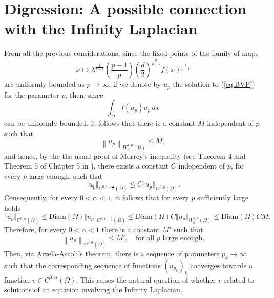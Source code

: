 \documentclass[11pt]{amsart}
\theoremstyle{definition}
\begin{document}
  \section{Digression: A possible connection with the Infinity Laplacian}  
\label{section:final_digression}
From all the previous considerations, since the fixed
points of the family of maps
\[
x\mapsto \lambda^{\frac{1}{p-1}}  \left(\frac{p-1}{p}\right)
\left(\frac{d}{2}\right)^{\frac{p}{p-1}}f\left(x\right)^{\frac{1}{p-1}}
\]
are uniformly bounded as $p\rightarrow\infty$, if we denote by $u_p$ the
solution to (\ref{eq:BVP}) for the parameter $p$, then, since
\[
\int_{\Omega}f\left(u_p\right)u_p\, dx
\]
can be uniformly bounded, 
it follows that there is a constant $M$ independent
of $p$ such that
\[
\left\|u_p\right\|_{W^{1,p}_0\left(\Omega\right)}
\leq M,
\]
and hence, by the the usual proof of Morrey's inequality (see Theorem 4 and  Theorem 5 of Chapter 5 in \cite{EvansBook}), there exists a constant $C$ independent of $p$, for every $p$ large enough, such that
$$\Vert u_p\Vert_{C^{0,1-\frac{n}{p}}(\overline\Omega)}\leq C\Vert u_p\Vert_{W^{1,p}(\Omega)}.$$
Consequently, for every $0<\alpha<1$, it follows that for every $p$ sufficiently large holds
$$\Vert u_p\Vert_{C^{0,\alpha}(\overline \Omega)}\leq\text{Diam}(\Omega)\Vert u_p\Vert_{C^{0,1-\frac{n}{p}}(\overline \Omega)}\leq \text{Diam}(\Omega)C\Vert u_p\Vert_{W_0^{1,p}(\Omega)}\leq \text{Diam}(\Omega)CM.$$
Therefore, for every $0<\alpha<1$ there is a constant $M'$ such that
\[
\left\|u_p\right\|_{C^{0,\alpha}(\overline\Omega)}
\leq M',\quad\text{for all }p\text{ large enough.}
\]
Then, via Arzelà-Ascoli's theorem, there is
a sequence of parameters $p_k\rightarrow \infty$ such that
the corresponding sequence of functions $\left(u_{p_k}\right)_k$ converges 
towards a function $v\in C^{0,\alpha}\left(\Omega\right)$. 
This raises the natural question of whether $v$ related
to solutions of an equation involving the Infinity Laplacian.
\end{document}
